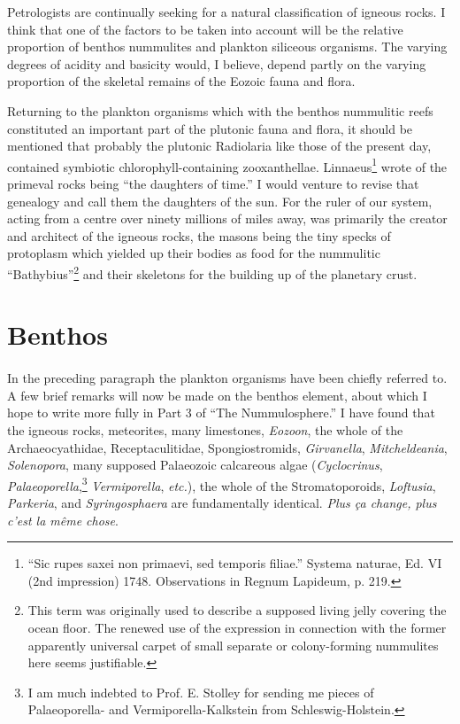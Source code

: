 \documentclass[a4paper, 12pt, oneside]{article}
\begin{document}
Petrologists are continually seeking for a natural classification of igneous rocks. I think that one of the factors to be taken into account will be the relative proportion of benthos nummulites and plankton siliceous organisms. The varying degrees of acidity and basicity would, I believe, depend partly on the varying proportion of the skeletal remains of the Eozoic fauna and flora.

Returning to the plankton organisms which with the benthos nummulitic reefs constituted an important part of the plutonic fauna and flora, it should be mentioned that probably the plutonic Radiolaria like those of the present day, contained symbiotic chlorophyll-containing zooxanthellae. Linnaeus\footnote{``Sic rupes saxei non primaevi, sed temporis filiae.'' Systema naturae, Ed. VI (2nd impression) 1748. Observations in Regnum Lapideum, p. 219.} wrote of the primeval rocks being ``the daughters of time.'' I would venture to revise that genealogy and call them the daughters of the sun. For the ruler of our system, acting from a centre over ninety millions of miles away, was primarily the creator and architect of the igneous rocks, the masons being the tiny specks of protoplasm which yielded up their bodies as food for the nummulitic ``Bathybius''\footnote{This term was originally used to describe a supposed living jelly covering the ocean floor. The renewed use of the expression in connection with the former apparently universal carpet of small separate or colony-forming nummulites here seems justifiable.} and their skeletons for the building up of the planetary crust.
\clearpage
\section{Benthos}
\paragraph{}
In the preceding paragraph the plankton organisms have been chiefly referred to. A few brief remarks will now be made on the benthos element, about which I hope to write more fully in Part 3 of ``The Nummulosphere.'' I have found that the igneous rocks, meteorites, many limestones, \emph{Eozoon}, the whole of the Archaeocyathidae, Receptaculitidae, Spongiostromids, \emph{Girvanella}, \emph{Mitcheldeania}, \emph{Solenopora}, many supposed Palaeozoic calcareous algae (\emph{Cyclocrinus}, \emph{Palaeoporella},\footnote{I am much indebted to Prof. E. Stolley for sending me pieces of Palaeoporella- and Vermiporella-Kalkstein from Schleswig-Holstein.} \emph{Vermiporella}, \emph{etc.}), the whole of the Stromatoporoids, \emph{Loftusia}, \emph{Parkeria}, and \emph{Syringosphaera} are fundamentally identical. \emph{Plus ça change, plus c'est la même chose}.
\end{document}

